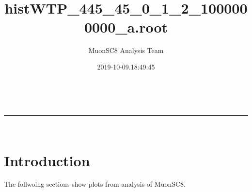 \documentclass[a4paper,11pt]{article}
\makeatletter
\newcommand{\linia}{\rule{\linewidth}{0.5pt}}
\theoremstyle{mytheor}
\renewcommand{\maketitle}{
\begin{center}
\vspace{2ex}
{\huge \textsc{\@title}}
\vspace{1ex}
\\
\linia\\
\@author \hfill \@date
\vspace{4ex}
\end{center}
}
\makeatother
\begin{document}
\title{histWTP\_445\_45\_0\_1\_2\_1000000000\_a.root}

\author{MuonSC8 Analysis Team }

\date{2019-10-09.18:49:45}

\maketitle

\section{Introduction}

The follwoing sections show plots from analysis of MuonSC8. 





\end{document}
